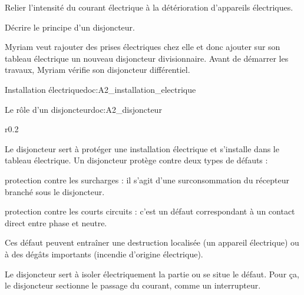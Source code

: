 \tetePremStssElec
\vspace*{-36pt}

\begin{objectifs}
  \item Relier l'intensité du courant électrique à la détérioration d'appareils électriques.
  \item Décrire le principe d'un disjoncteur.
\end{objectifs}



\begin{contexte}  
  Myriam veut rajouter des prises électriques chez elle et donc ajouter sur son tableau électrique un nouveau disjoncteur divisionnaire.
  Avant de démarrer les travaux, Myriam vérifie son disjoncteur différentiel.

\end{contexte}

\begin{doc}{Installation électrique}{doc:A2_installation_electrique}
  \begin{center}
  \end{center}
\end{doc}

\begin{doc}{Le rôle d'un disjoncteur}{doc:A2_disjoncteur}
  \begin{wrapfigure}[8]{r}{0.2\linewidth}
    \vspace*{-24pt}
    \centering
  \end{wrapfigure}
  Le disjoncteur sert à protéger une installation électrique et s'installe dans le tableau électrique.
  Un disjoncteur protège contre deux types de défauts :
  \begin{listePoints}
    \item protection contre les surcharges : il s'agit d'une surconsommation du récepteur branché sous le disjoncteur.
    \item protection contre les courts circuits : c'est un défaut correspondant à un contact direct entre phase et neutre.
  \end{listePoints}
  Ces défaut peuvent entraîner une destruction localisée (un appareil électrique) ou à des dégâts importants (incendie d'origine électrique).
  
  Le disjoncteur sert à isoler électriquement la partie ou se situe le défaut.
  Pour ça, le disjoncteur sectionne le passage du courant, comme un interrupteur.
\end{doc}

